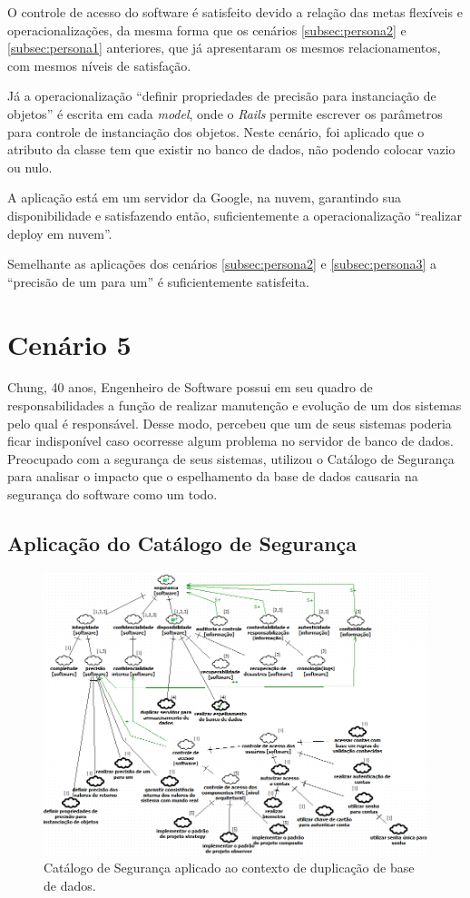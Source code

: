 O controle de acesso do software é satisfeito devido a relação das metas flexíveis e operacionalizações, da mesma forma que os cenários \ref{subsec:persona2} e \ref{subsec:persona1} anteriores, que já apresentaram os mesmos relacionamentos, com mesmos níveis de satisfação.  

Já a operacionalização “definir propriedades de precisão para instanciação de objetos” é escrita em cada \textit{model}, onde o \textit{Rails} permite escrever os parâmetros para controle de instanciação dos objetos. Neste cenário, foi aplicado que o atributo da classe tem que existir no banco de dados, não podendo colocar vazio ou nulo. 

A aplicação está em um servidor da Google, na nuvem, garantindo sua disponibilidade e satisfazendo então, suficientemente a operacionalização “realizar deploy em nuvem”. 

Semelhante as aplicações dos cenários \ref{subsec:persona2} e \ref{subsec:persona3} a “precisão de um para um” é suficientemente satisfeita. 

\section{Cenário 5}
\label{subsec:persona5}

Chung, 40 anos, Engenheiro de Software possui em seu quadro de responsabilidades a função de realizar manutenção e evolução de um dos sistemas pelo qual é responsável. Desse modo, percebeu que um de seus sistemas poderia ficar indisponível caso ocorresse algum problema no servidor de banco de dados. Preocupado com a segurança de seus sistemas, utilizou o Catálogo de Segurança para analisar o impacto que o espelhamento da base de dados causaria na segurança do software como um todo. 

\subsection{Aplicação do Catálogo de Segurança}

\begin{figure}[h!]
	\centering
	\includegraphics[keepaspectratio=true,scale=0.7]{figuras/catalogoPersona5.PNG}
	\caption{Catálogo de Segurança aplicado ao contexto de duplicação de base de dados.}
	\label{catalogoPersona5}
\end{figure}

